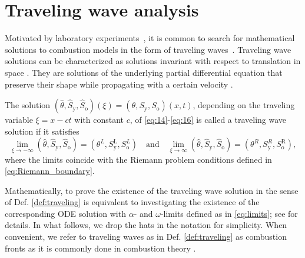 \section{Traveling wave analysis}
\label{sec:traveling}

Motivated by laboratory experiments~\cite{khoshnevis2014combustion, gargar2015recovery, gargar2014recovery, zheng2017numerical, anderson2022analysis, blackwell1959factors},
it is common to search for mathematical solutions to combustion models in the form of traveling waves~\cite{ozbag2018traveling, da1999traveling, ghazaryan2013gasless, gordon2006travelling, ghazaryan2011stability}.
Traveling wave solutions can be characterized as solutions invariant with respect to translation in space \cite{volpert1994traveling}.
They are solutions of the underlying partial differential equation that preserve their shape while propagating with a certain velocity \cite{ghazaryan2022introduction}.

\begin{definition}
	\label{def:traveling}
	The solution $\left(\hat\theta,\hat S_{\text{y}},\hat S_{\text{o}}\right)\left(\xi\right)=\left(\theta,S_{\text{y}},S_{\text{o}}\right)\left(x,t\right)$,
	depending on the traveling variable $\xi=x-ct$ with constant $c$, of \eqref{eq:14}-\eqref{eq:16} is called a traveling wave solution if it satisfies
	\begin{equation}
		\label{eq:limits}
		\lim_{\xi\to-\infty} (\hat\theta,\hat S_{\text{y}},\hat S_{\text{o}}) = (\theta^L,S_{\text{y}}^{\text{L}},S_{\text{o}}^L)
		\quad \text{and} \quad
		\lim_{\xi\to\infty} (\hat\theta,\hat S_{\text{y}},\hat S_{\text{o}}) = (\theta^R,S_{\text{y}}^R,S_{\text{o}}^{\text{R}}),
	\end{equation}
	where the limits coincide with the Riemann problem conditions defined in \eqref{eq:Riemann_boundary}.
\end{definition}

Mathematically, to prove the existence of the traveling wave solution in the sense of Def. \ref{def:traveling} is equivalent to investigating the existence of the corresponding ODE solution with $\alpha$- and $\omega$-limits defined as in \eqref{eq:limits}; see \cite{guckenheimer2013nonlinear,sotomayor1979liccoes} for details.
In what follows, we drop the hats in the notation for simplicity.
When convenient, we refer to traveling waves as in Def. \ref{def:traveling} as combustion fronts as it is commonly done in combustion theory
\cite{ghazaryan2022introduction}.

